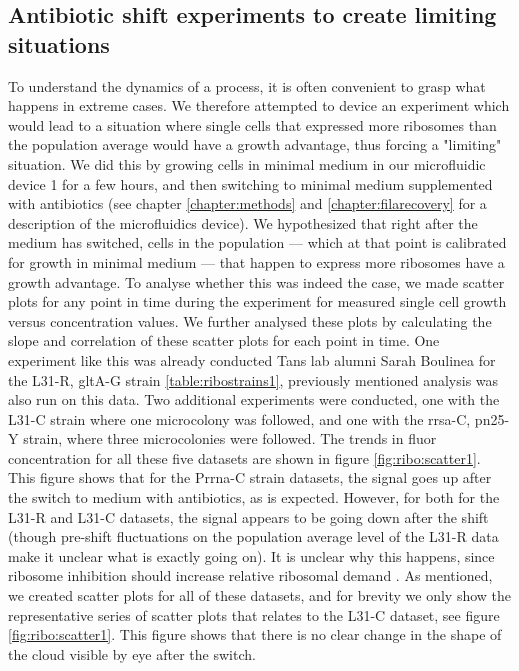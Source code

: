 \subsection*{Antibiotic shift experiments to create limiting situations}


To understand the dynamics of a process, it is often convenient to grasp what happens in extreme cases.
%
We therefore attempted to device an experiment which would lead to a situation where single cells that expressed more ribosomes than the population average would have a growth advantage, thus forcing a "limiting" situation.
% 
We did this by growing cells in minimal medium in our microfluidic device 1 for a few hours, and then switching to minimal medium supplemented with antibiotics (see chapter \ref{chapter:methods} and \ref{chapter:filarecovery} for a description of the microfluidics device).
%
We hypothesized that right after the medium has switched, cells in the population --- which at that point is calibrated for growth in minimal medium --- that happen to express more ribosomes have a growth advantage.
%
To analyse whether this was indeed the case, we made scatter plots for any point in time during the experiment for measured single cell growth versus concentration values.
We further analysed these plots by calculating the slope and correlation of these scatter plots for each point in time.
%
One experiment like this was already conducted Tans lab alumni Sarah Boulinea for the L31-R, gltA-G strain \ref{table:ribostrains1}, previously mentioned analysis was also run on this data.
Two additional experiments were conducted, one with the L31-C strain where one microcolony was followed, and one with the rrsa-C, pn25-Y strain, where three microcolonies were followed.
%
The trends in fluor concentration for all these five datasets are shown in figure \ref{fig:ribo:scatter1}.
This figure shows that for the Prrna-C strain datasets, the signal goes up after the switch to medium with antibiotics, as is expected.
However, for both for the L31-R and L31-C datasets, the signal appears to be going down after the shift (though pre-shift fluctuations on the population average level of the L31-R data make it unclear what is exactly going on).
It is unclear why this happens, since ribosome inhibition should increase relative ribosomal demand \cite{You2013}.
%
As mentioned, we created scatter plots for all of these datasets, and for brevity we only show the representative series of scatter plots that relates to the L31-C dataset, see figure \ref{fig:ribo:scatter1}. 
This figure shows that there is no clear change in the shape of the cloud visible by eye after the switch.
%


